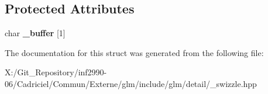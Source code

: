 \subsection*{Protected Attributes}
\begin{DoxyCompactItemize}
\item 
\hypertarget{structglm_1_1detail_1_1__swizzle__base0_afd4b7f15c9acff4cdef808f559ffec2d}{char {\bfseries \-\_\-buffer} \mbox{[}1\mbox{]}}\label{structglm_1_1detail_1_1__swizzle__base0_afd4b7f15c9acff4cdef808f559ffec2d}

\end{DoxyCompactItemize}


The documentation for this struct was generated from the following file\-:\begin{DoxyCompactItemize}
\item 
X\-:/\-Git\-\_\-\-Repository/inf2990-\/06/\-Cadriciel/\-Commun/\-Externe/glm/include/glm/detail/\-\_\-swizzle.\-hpp\end{DoxyCompactItemize}
